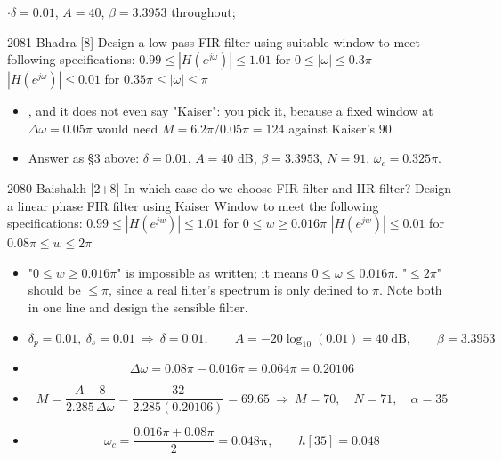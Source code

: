 {\color{sub}\footnotesize {} \gap$\cdot$\gap $\delta=0.01$, $A=40$,
$\beta=3.3953$ throughout; }

\begin{asked}{2081 Bhadra \textperiodcentered{} [8]}
Design a low pass FIR filter using suitable window to meet following
specifications:\newline
$0.99\le|H(e^{j\omega})|\le1.01$ \quad for $0\le|\omega|\le0.3\pi$\newline
$|H(e^{j\omega})|\le0.01$ \quad for $0.35\pi\le|\omega|\le\pi$
\end{asked}

\begin{itemize}
  \item {}, and it does not even say "Kaiser": you
        pick it, because a fixed window at $\Delta\omega=0.05\pi$ would need
        $M=6.2\pi/0.05\pi=124$ against Kaiser's $90$.
  \item Answer as \S3 above: $\delta=0.01$, $A=40$ dB, $\beta=3.3953$,
        $\boxed{N=91}$, $\omega_c=0.325\pi$.
\end{itemize}

\begin{asked}{2080 Baishakh \textperiodcentered{} [2+8]}
In which case do we choose FIR filter and IIR filter? Design a linear phase FIR filter
using Kaiser Window to meet the following specifications:\newline
$0.99\le|H(e^{jw})|\le1.01$ \quad for $0\le w\ge0.016\pi$\newline
$|H(e^{jw})|\le0.01$ \quad for $0.08\pi\le w\le2\pi$
\end{asked}

\begin{itemize}
  \item {} "$0\le w\ge0.016\pi$" is
        impossible as written; it means $0\le\omega\le0.016\pi$. "$\le2\pi$" should be
        $\le\pi$, since a real filter's spectrum is only defined to $\pi$. Note both in
        one line and design the sensible filter.
  \item[] \[ \delta_p=0.01,\ \delta_s=0.01\ \Rightarrow\ \delta=0.01,\qquad
             A=-20\log_{10}(0.01)=40\ \text{dB},\qquad \beta=3.3953 \]
  \item[] \[ \Delta\omega=0.08\pi-0.016\pi=0.064\pi=0.20106 \]
  \item[] \[ M=\frac{A-8}{2.285\,\Delta\omega}=\frac{32}{2.285(0.20106)}=69.65
             \ \Rightarrow\ M=70,\quad \boxed{N=71},\quad \alpha=35 \]
  \item[] \[ \omega_c=\frac{0.016\pi+0.08\pi}{2}=\mathbf{0.048\pi},\qquad h[35]=0.048 \]
\end{itemize}

